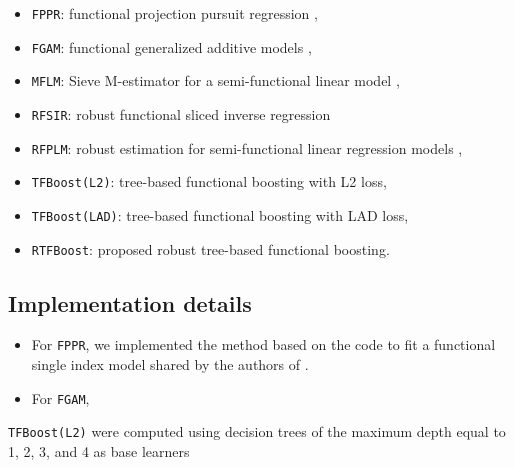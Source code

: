 \documentclass{article}
\begin{document}
\begin{itemize}
 \setlength\itemsep{0.1em}
\item \texttt{FPPR}: functional projection pursuit regression \citep{ferraty2013functional},
\item \texttt{FGAM}: functional generalized additive models \citep{mclean2014functional}, 
\item \texttt{MFLM}: Sieve M-estimator for a semi-functional linear model \citep{huang2015sieve},
\item \texttt{RFSIR}: robust functional sliced inverse regression \citep{wang2017robust}
\item \texttt{RFPLM}: robust estimation for semi-functional linear regression models \citep{boente2020robust},
\item  \texttt{TFBoost(L2)}:  tree-based functional boosting with L2 loss,
\item  \texttt{TFBoost(LAD)}:  tree-based functional boosting with LAD loss,
\item  \texttt{RTFBoost}:  proposed robust  tree-based functional boosting. 
\end{itemize}

\subsection{Implementation details}

\begin{itemize}
	\item For \texttt{FPPR}, we implemented the method based on the code to fit a functional single index model shared by  the authors of \cite{ferraty2013functional}. 
	\item For \texttt{FGAM},  
\end{itemize}






\texttt{TFBoost(L2)}  were computed using decision trees of the maximum depth equal to 1, 2, 3, and 4 as base learners



%




\end{document}
